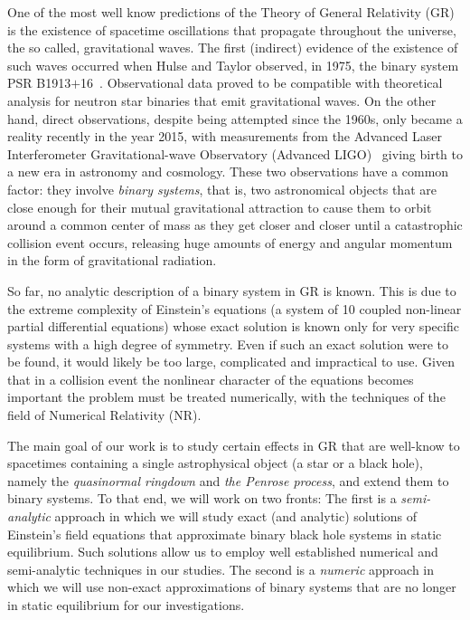 One of the most well know predictions of the Theory of General Relativity (GR) is the existence of spacetime oscillations that propagate throughout the universe, the so called, gravitational waves. The first (indirect) evidence of the existence of such waves occurred when Hulse and Taylor observed, in 1975, the binary system PSR B1913$+$16~\cite{1975ApJ...195L..51H}. Observational data proved to be compatible with theoretical analysis for neutron star binaries that emit gravitational waves. On the other hand, direct observations, despite being attempted since the 1960s, only became a reality recently in the year 2015, with measurements from the Advanced Laser Interferometer Gravitational-wave Observatory (Advanced LIGO)~\cite{grav1,grav2} giving birth to a new era in astronomy and cosmology. These two observations have a common factor: they involve \emph{binary systems}, that is, two astronomical objects that are close enough for their mutual gravitational attraction to cause them to orbit around a common center of mass as they get closer and closer until a catastrophic collision event occurs, releasing huge amounts of energy and angular momentum in the form of gravitational radiation.

So far, no analytic description of a binary system in GR is known. This is due to the extreme complexity of Einstein's equations (a system of 10 coupled non-linear partial differential equations) whose exact solution is known only for very specific systems with a high degree of symmetry. Even if such an exact solution were to be found, it would likely be too large, complicated and impractical to use. Given that in a collision event the nonlinear character of the equations becomes important the problem must be treated numerically, with the techniques of the field of Numerical Relativity (NR).

The main goal of our work is to study certain effects in GR that are well-know to spacetimes containing a single astrophysical object (a star or a black hole), namely the \emph{quasinormal ringdown} and \emph{the Penrose process}, and extend them to binary systems. To that end, we will work on two fronts: The first is a \emph{semi-analytic} approach in which we will study exact (and analytic) solutions of Einstein's field equations that approximate binary black hole systems in static equilibrium. Such solutions allow us to employ well established numerical and semi-analytic techniques in our studies. The second is a \emph{numeric} approach in which we will use non-exact approximations of binary systems that are no longer in static equilibrium for our investigations.
